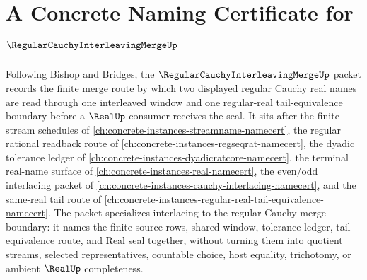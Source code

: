 \chapter{A Concrete Naming Certificate for $\RegularCauchyInterleavingMergeUp$}
\label{ch:concrete-instances-regular-cauchy-interleaving-merge-namecert}

Following Bishop and Bridges, the $\RegularCauchyInterleavingMergeUp$ packet records the finite merge route by which two displayed regular Cauchy real names are read through one interleaved window and one regular-real tail-equivalence boundary before a $\RealUp$ consumer receives the seal. It sits after the finite stream schedules of \autoref{ch:concrete-instances-streamname-namecert}, the regular rational readback route of \autoref{ch:concrete-instances-regseqrat-namecert}, the dyadic tolerance ledger of \autoref{ch:concrete-instances-dyadicratcore-namecert}, the terminal real-name surface of \autoref{ch:concrete-instances-real-namecert}, the even/odd interlacing packet of \autoref{ch:concrete-instances-cauchy-interlacing-namecert}, and the same-real tail route of \autoref{ch:concrete-instances-regular-real-tail-equivalence-namecert}. The packet specializes interlacing to the regular-Cauchy merge boundary: it names the finite source rows, shared window, tolerance ledger, tail-equivalence route, and Real seal together, without turning them into quotient streams, selected representatives, countable choice, host equality, trichotomy, or ambient $\RealUp$ completeness.

